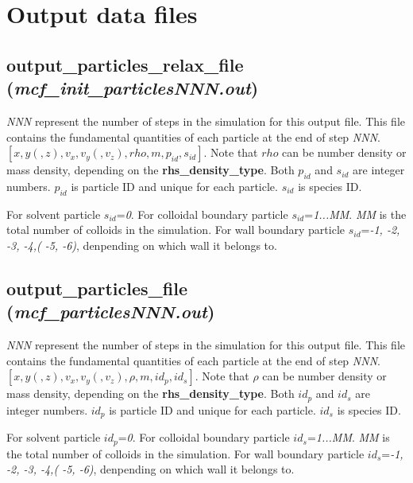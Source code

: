\documentclass[a4paper,10pt]{article}
\begin{document}
\section{Output data files}

\subsection{\textbf{output\_particles\_relax\_file}\\
(\textit{mcf\_init\_particlesNNN.out})}
\textit{NNN} represent the number of steps in the simulation for this output file.
This file contains the fundamental quantities of each particle
at the end of step \textit{NNN}.
\textbf{$[x, y(, z), v_x, v_y(, v_z), rho, m, p_{id}, s_{id}]$}.
Note that \textbf{$rho$} can be number density or mass density,
depending on the \textbf{rhs\_density\_type}.
Both \textbf{$p_{id}$} and \textbf{$s_{id}$} are integer numbers.
\textbf{$p_{id}$} is particle ID and
unique for each particle.
\textbf{$s_{id}$} is species ID.

For solvent particle \textbf{$s_{id}$}=\textit{0}.
For colloidal boundary particle \textbf{$s_{id}$}=\textit{1...\textit{MM}}.
\textit{MM} is the total number of colloids
in the simulation.
For wall boundary particle \textbf{$s_{id}$}=\textit{-1, -2, -3, -4,( -5, -6)},
denpending on which wall it belongs to.

\subsection{\textbf{output\_particles\_file}\\
(\textit{mcf\_particlesNNN.out})}
\textit{NNN} represent the number of steps in the simulation for this output file.
This file contains the fundamental quantities of each particle
at the end of step \textit{NNN}.
\textbf{$[x, y(, z), v_x, v_y(, v_z), \rho, m, {id}_p, {id}_s]$}.
Note that \textbf{$\rho$} can be number density or mass density,
depending on the \textbf{rhs\_density\_type}.
Both \textbf{${id}_p$} and \textbf{${id}_s$} are integer numbers.
\textbf{${id}_p$} is particle ID and
unique for each particle.
\textbf{${id}_s$} is species ID.

For solvent particle \textbf{${id}_p$}=\textit{0}.
For colloidal boundary particle \textbf{${id}_s$}=\textit{1...\textit{MM}}.
\textit{MM} is the total number of colloids
in the simulation.
For wall boundary particle \textbf{${id}_s$}=\textit{-1, -2, -3, -4,( -5, -6)},
denpending on which wall it belongs to.
\end{document}
